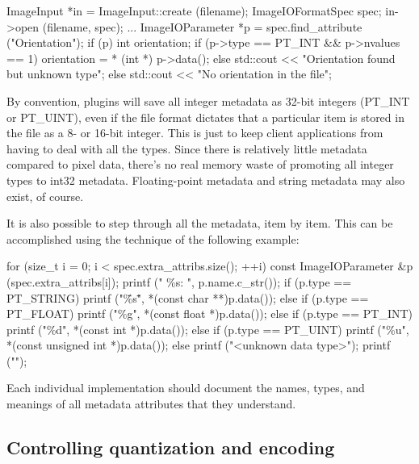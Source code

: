 \begin{code}
        ImageInput *in = ImageInput::create (filename);
        ImageIOFormatSpec spec;
        in->open (filename, spec);
        ...
        ImageIOParameter *p = spec.find_attribute ("Orientation");
        if (p) {
            int orientation;
            if (p->type == PT_INT && p->nvalues == 1)
                orientation = * (int *) p->data();
            else
                std::cout << "Orientation found but unknown type\n";
        } else {
            std::cout << "No orientation in the file\n";
        }
\end{code}

By convention, \ImageInput plugins will save all integer metadata as
32-bit integers ({\cf PT_INT} or {\cf PT_UINT}), even if the file format
dictates that a particular item is stored in the file as a 8- or 16-bit
integer.  This is just to keep client applications from having to deal
with all the types.  Since there is relatively little metadata compared
to pixel data, there's no real memory waste of promoting all integer
types to int32 metadata.  Floating-point metadata and string metadata
may also exist, of course.

It is also possible to step through all the metadata, item by item.
This can be accomplished using the technique of the following example:

\begin{code}
        for (size_t i = 0;  i < spec.extra_attribs.size();  ++i) {
            const ImageIOParameter &p (spec.extra_attribs[i]);
            printf ("    \%s: ", p.name.c_str());
            if (p.type == PT_STRING)
                printf ("\"\%s\"", *(const char **)p.data());
            else if (p.type == PT_FLOAT)
                printf ("\%g", *(const float *)p.data());
            else if (p.type == PT_INT)
                printf ("\%d", *(const int *)p.data());
            else if (p.type == PT_UINT)
                printf ("\%u", *(const unsigned int *)p.data());
            else
                printf ("<unknown data type>");
            printf ("\n");
        }
\end{code}

Each individual \ImageInput implementation should document the names,
types, and meanings of all metadata attributes that they understand.


\subsection{Controlling quantization and encoding}
\label{sec:imageinput:quantization}


